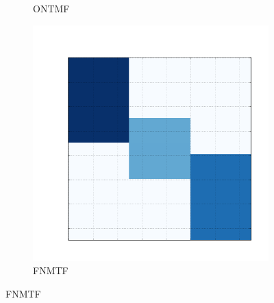 \documentclass[10pt]{beamer}
\begin{document}
\begin{frame}
\begin{figure}[H]
\begin{subfigure}[b]{0.2\textwidth}
          \caption*{ONTMF}
      \end{subfigure}
      \begin{subfigure}[b]{0.2\textwidth}
          \includegraphics[width=\textwidth]{img/e-reconstruction-2-fnmtf.png}
          \caption*{FNMTF}
      \end{subfigure}
  \end{figure}


\end{frame}

\end{document}

